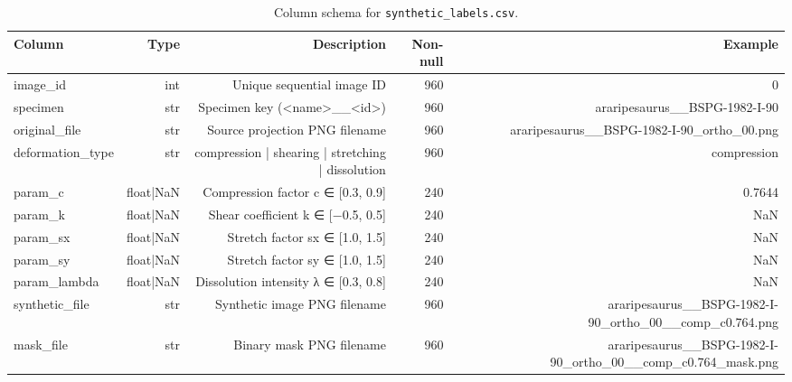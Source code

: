 \begin{table}[htbp]
\caption{Column schema for \texttt{synthetic\_labels.csv}.}
\label{tab:csv_schema}
\begin{tabular}{lrrrr}
\toprule
Column & Type & Description & Non-null & Example \\
\midrule
image\_id & int & Unique sequential image ID & 960 & 0 \\
specimen & str & Specimen key (<name>\_\_<id>) & 960 & araripesaurus\_\_BSPG-1982-I-90 \\
original\_file & str & Source projection PNG filename & 960 & araripesaurus\_\_BSPG-1982-I-90\_ortho\_00.png \\
deformation\_type & str & compression | shearing | stretching | dissolution & 960 & compression \\
param\_c & float|NaN & Compression factor c ∈ [0.3, 0.9] & 240 & 0.7644 \\
param\_k & float|NaN & Shear coefficient k ∈ [−0.5, 0.5] & 240 & NaN \\
param\_sx & float|NaN & Stretch factor sx ∈ [1.0, 1.5] & 240 & NaN \\
param\_sy & float|NaN & Stretch factor sy ∈ [1.0, 1.5] & 240 & NaN \\
param\_lambda & float|NaN & Dissolution intensity λ ∈ [0.3, 0.8] & 240 & NaN \\
synthetic\_file & str & Synthetic image PNG filename & 960 & araripesaurus\_\_BSPG-1982-I-90\_ortho\_00\_\_comp\_c0.764.png \\
mask\_file & str & Binary mask PNG filename & 960 & araripesaurus\_\_BSPG-1982-I-90\_ortho\_00\_\_comp\_c0.764\_mask.png \\
\bottomrule
\end{tabular}
\end{table}
